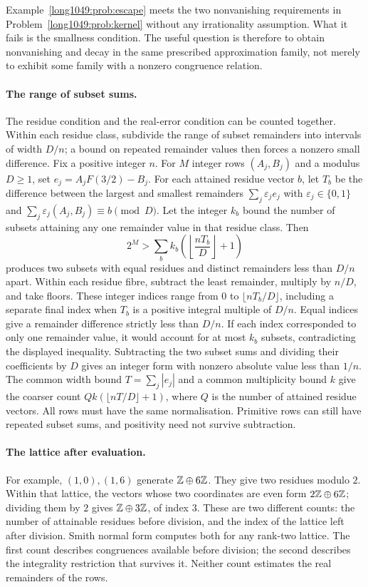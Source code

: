 \documentclass[11pt]{article}
\begin{document}
Example~\ref{long1049:prob:escape} meets the two nonvanishing
requirements in Problem~\ref{long1049:prob:kernel} without any
irrationality assumption. What it fails is the smallness condition.
The useful question is therefore to obtain nonvanishing and decay in
the same prescribed approximation family, not merely to exhibit some
family with a nonzero congruence relation.

\paragraph{The range of subset sums.}
The residue condition and the real-error condition can be counted
together. Within each residue class, subdivide the range of subset
remainders into intervals of width $D/n$; a bound on repeated
remainder values then forces a nonzero small difference. Fix a
positive integer $n$. For $M$ integer rows $(A_j,B_j)$ and a modulus
$D\ge1$, set $e_j=A_jF(3/2)-B_j$. For each attained residue vector $b$,
let $T_b$ be the difference between the largest and smallest remainders
$\sum_j\varepsilon_je_j$ with $\varepsilon_j\in\{0,1\}$ and
$\sum_j\varepsilon_j(A_j,B_j)\equiv b\pmod D$. Let the integer $k_b$
bound the number of subsets attaining any one remainder value in that
residue class. Then
\[
 2^M>\sum_b k_b\left(\left\lfloor\frac{nT_b}{D}\right\rfloor+1\right)
\]
produces two subsets with equal residues and distinct remainders
less than $D/n$ apart. Within each residue fibre, subtract the least
remainder, multiply by $n/D$, and take floors. These integer indices range
from $0$ to $\lfloor nT_b/D\rfloor$, including a separate final index
when $T_b$ is a positive integral multiple of $D/n$. Equal indices
give a remainder difference strictly less than $D/n$. If each index
corresponded to only one remainder value, it would account for at most
$k_b$ subsets, contradicting the displayed inequality. Subtracting the
two subset sums and dividing their coefficients by $D$ gives an integer
form with nonzero absolute value less than $1/n$. The common width bound
$T=\sum_j|e_j|$ and a common multiplicity bound $k$ give the coarser
count $Qk(\lfloor nT/D\rfloor+1)$, where $Q$ is the number of attained
residue vectors. All rows must have the same normalisation. Primitive
rows can still have repeated subset sums, and positivity need not
survive subtraction.

\paragraph{The lattice after evaluation.}
For example, $(1,0),(1,6)$ generate $\mathbb{Z}\oplus6\mathbb{Z}$. They give two
residues modulo $2$. Within that lattice, the vectors whose two
coordinates are even form $2\mathbb{Z}\oplus6\mathbb{Z}$; dividing them by $2$ gives
$\mathbb{Z}\oplus3\mathbb{Z}$, of index $3$. These are two different counts: the number of attainable residues
before division, and the index of the lattice left after division.
Smith normal form computes both for any rank-two lattice. The
first count describes congruences available before division; the
second describes the integrality restriction that survives it.
Neither count estimates the real remainders of the rows.
\end{document}
